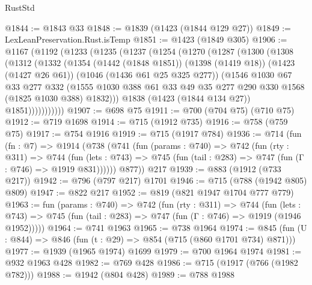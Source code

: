 \begin{lexlean}{RustStd}
\begin{coremodule}
{\begin{coremodule}
{{{{{{{{@1844 := @1843 @33
@1848 := @1839 (@1423 (@1844 @129 @27))
@1849 := LexLeanPreservation.Rust.isTemp
@1851 := @1423 (@1849 @305)
@1906 := @1167
    (@1192
      (@1233
        (@1235
          (@1237
            (@1254
              (@1270
                (@1287
                  (@1300
                    (@1308
                      (@1312
                        (@1332
                          (@1354
                            (@1442 (@1848 @1851))
                            (@1398 (@1419 @18))
                            (@1423 (@1427 @26 @61))
                            (@1046 (@1436 @61 @25 @325 @277))
                            (@1546
                              @1030
                              @67
                              @33
                              @277
                              @332
                              (@1555
                                @1030
                                @388
                                @61
                                @33
                                @49
                                @35
                                @277
                                @290
                                @330
                                @1568
                                (@1825 @1030 @388)
                                @1832)))
                          @1838
                          (@1423 (@1844 @134 @27))
                          @1851)))))))))))
@1907 := @698 @75
@1911 := @700 (@704 @75) (@710 @75)
@1912 := @719 @1698
@1914 := @715 (@1912 @735)
@1916 := @758 (@759 @75)
@1917 := @754 @1916
@1919 := @715 (@1917 @784)
@1936 := @714
    (fun (fn : @7) =>
    @1914
      (@738
        (@741
          (fun (params : @740) =>
          @742
            (fun (rty : @311) =>
            @744
              (fun (lets : @743) =>
              @745 (fun (tail : @283) => @747 (fun (Γ : @746) => @1919 @831))))))
        @877))
    @217
@1939 := @883 (@1912 (@733 @217))
@1942 := @796 (@797 @217) @1701
@1946 := @715 (@788 (@1942 @805) @809)
@1947 := @822 @217
@1952 := @819 (@821 @1947 @1704 @777 @779)
@1963 := fun (params : @740) =>
  @742
    (fun (rty : @311) =>
    @744
      (fun (lets : @743) =>
      @745 (fun (tail : @283) => @747 (fun (Γ : @746) => @1919 (@1946 @1952)))))
@1964 := @741 @1963
@1965 := @738 @1964
@1974 := @845 (fun (U : @844) => @846 (fun (t : @29) => @854 (@715 (@860 @1701 @734) @871)))
@1977 := @1939 (@1965 @1974) @1699
@1979 := @700 @1964 @1974
@1981 := @932 @1963 @428
@1982 := @769 @428
@1986 := @715 (@1917 (@766 (@1982 @782)))
@1988 := @1942 (@804 @428)
@1989 := @788 @1988
}}}}}}}}
\end{coremodule}}
\end{coremodule}
\end{lexlean}
